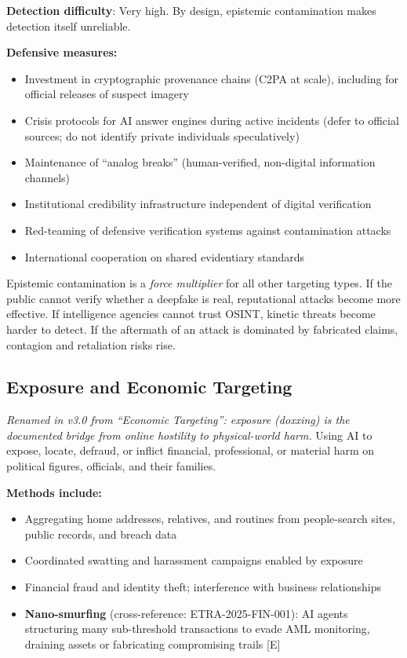 \documentclass[11pt,letterpaper]{article}
\begin{document}
\textbf{Detection difficulty}: Very high. By design, epistemic contamination makes detection itself unreliable.

\textbf{Defensive measures:}
\begin{itemize}
  \item Investment in cryptographic provenance chains (C2PA at scale), including for official releases of suspect imagery
  \item Crisis protocols for AI answer engines during active incidents (defer to official sources; do not identify private individuals speculatively)
  \item Maintenance of ``analog breaks'' (human-verified, non-digital information channels)
  \item Institutional credibility infrastructure independent of digital verification
  \item Red-teaming of defensive verification systems against contamination attacks
  \item International cooperation on shared evidentiary standards
\end{itemize}

\begin{keybox}
Epistemic contamination is a \textit{force multiplier} for all other targeting types. If the public cannot verify whether a deepfake is real, reputational attacks become more effective. If intelligence agencies cannot trust OSINT, kinetic threats become harder to detect. If the aftermath of an attack is dominated by fabricated claims, contagion and retaliation risks rise.
\end{keybox}

\subsection{Exposure and Economic Targeting}

\textit{Renamed in v3.0 from ``Economic Targeting'': exposure (doxxing) is the documented bridge from online hostility to physical-world harm.} Using AI to expose, locate, defraud, or inflict financial, professional, or material harm on political figures, officials, and their families.

\textbf{Methods include:}
\begin{itemize}
  \item Aggregating home addresses, relatives, and routines from people-search sites, public records, and breach data
  \item Coordinated swatting and harassment campaigns enabled by exposure
  \item Financial fraud and identity theft; interference with business relationships
  \item \textbf{Nano-smurfing} (cross-reference: ETRA-2025-FIN-001): AI agents structuring many sub-threshold transactions to evade AML monitoring, draining assets or fabricating compromising trails [E]
\end{itemize}
\end{document}

